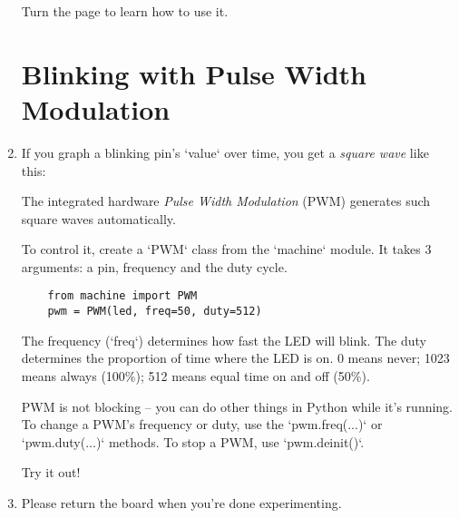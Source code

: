 \documentclass{../tutorial}
\begin{document}
\begin{enumerate}
    Turn the page to learn how to use it.

\clearpage

\section{Blinking with Pulse Width Modulation}

\item
    If you graph a blinking pin's `value` over time, you get a \emph{square wave}
    like this:

    \begin{figure}[h]
        \centering
    \end{figure}

    The integrated hardware \emph{Pulse Width Modulation} (PWM) generates
    such square waves automatically.

    To control it, create a `PWM` class from the `machine` module.
    It takes 3 arguments: a pin, frequency and the duty cycle.

    \begin{lstlisting}
    from machine import PWM
    pwm = PWM(led, freq=50, duty=512)
    \end{lstlisting}

    The frequency (`freq`) determines how fast the LED will blink.
    The duty determines the proportion of time where the LED is on.
    0 means never;
    1023 means always (100\%);
    512 means equal time on and off (50\%).

    \begin{comment}
    When experimenting, mind the fact that humans don't perceive light
    intensity linearly.
    A duty cycle of 256 (25\%) is a good “middle” value for a light.
    \end{comment}

    PWM is not blocking -- you can do other things in Python while it's running.
    To change a PWM's frequency or duty, use the `pwm.freq(...)`
    or `pwm.duty(...)` methods.
    To stop a PWM, use `pwm.deinit()`.

    Try it out!

\item
    Please return the board when you're done experimenting.

\end{enumerate}
\end{document}
